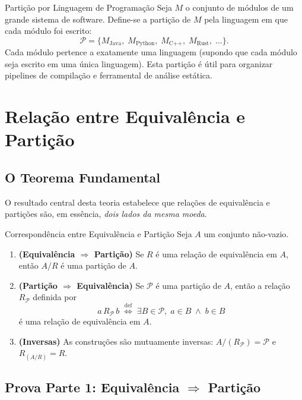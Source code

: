 \documentclass[12pt,a4paper]{book}
\begin{document}
\begin{exemplo}{Partição por Linguagem de Programação}{}
Seja $M$ o conjunto de módulos de um grande sistema de software. Define-se a partição de $M$ pela linguagem em que cada módulo foi escrito:
\[
  \mathcal{P} = \{M_{\text{Java}},\; M_{\text{Python}},\; M_{\text{C++}},\; M_{\text{Rust}},\;\dots\}.
\]
Cada módulo pertence a exatamente uma linguagem (supondo que cada módulo seja escrito em uma única linguagem). Esta partição é útil para organizar pipelines de compilação e ferramental de análise estática.
\end{exemplo}

\chapter{Relação entre Equivalência e Partição}

\section{O Teorema Fundamental}

O resultado central desta teoria estabelece que relações de equivalência e partições são, em essência, \emph{dois lados da mesma moeda}.

\begin{teorema}{Correspondência entre Equivalência e Partição}{}
Seja $A$ um conjunto não-vazio.
\begin{enumerate}[label=(\arabic*)]
  \item \textbf{(Equivalência $\Rightarrow$ Partição)} Se $R$ é uma relação de equivalência em $A$, então $A/R$ é uma partição de $A$.
  \item \textbf{(Partição $\Rightarrow$ Equivalência)} Se $\mathcal{P}$ é uma partição de $A$, então a relação $R_\mathcal{P}$ definida por
  \[
    a\,R_\mathcal{P}\,b \;\stackrel{\text{def}}{\Longleftrightarrow}\; \exists B \in \mathcal{P},\; a \in B \;\land\; b \in B
  \]
  é uma relação de equivalência em $A$.
  \item \textbf{(Inversas)} As construções são mutuamente inversas: $A/(R_\mathcal{P}) = \mathcal{P}$ e $R_{(A/R)} = R$.
\end{enumerate}
\end{teorema}

\section{Prova Parte 1: Equivalência $\Rightarrow$ Partição}
\end{document}
